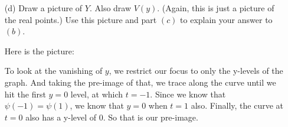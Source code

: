 \documentclass{article}
\begin{document}
\begin{itemize}
        \item [(d)] Draw a picture of $Y$. Also draw $V(y)$. (Again, this is just a picture of the real points.) Use this picture and part $(c)$ to explain your answer to $(b)$. 
            \begin{answer}
                Here is the picture:
                    \begin{center}
                    \end{center}
                To look at the vanishing of $y$, we restrict our focus to only the y-levels of the graph. And taking the pre-image of that, we trace along the curve until we hit the first $y = 0$ level, at which $t = -1$. Since we know that $\psi(-1) = \psi(1)$, we know that $y = 0$ when $t = 1$ also. Finally, the curve at $t = 0$ also has a y-level of $0$. So that is our pre-image.
            \end{answer}
    \end{itemize}
\end{document}
